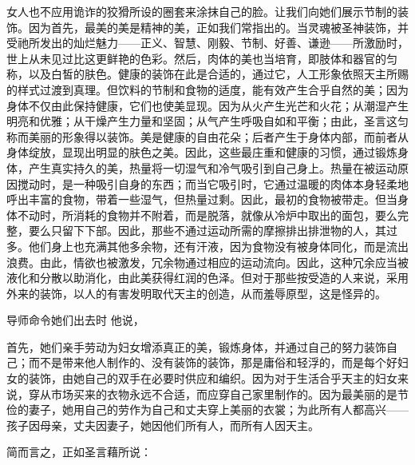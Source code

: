 女人也不应用诡诈的狡猾所设的圈套来涂抹自己的脸。让我们向她们展示节制的装饰。因为首先，最美的美是精神的美，正如我们常指出的。当灵魂被圣神装饰，并受祂所发出的灿烂魅力——正义、智慧、刚毅、节制、好善、谦逊——所激励时，世上从未见过比这更鲜艳的色彩。然后，肉体的美也当培育，即肢体和器官的匀称，以及白皙的肤色。健康的装饰在此是合适的，通过它，人工形象依照天主所赐的样式过渡到真理。但饮料的节制和食物的适度，能有效产生合乎自然的美；因为身体不仅由此保持健康，它们也使美显现。因为从火产生光芒和火花；从潮湿产生明亮和优雅；从干燥产生力量和坚固；从气产生呼吸自如和平衡；由此，圣言这匀称而美丽的形象得以装饰。美是健康的自由花朵；后者产生于身体内部，而前者从身体绽放，显现出明显的肤色之美。因此，这些最庄重和健康的习惯，通过锻炼身体，产生真实持久的美，热量将一切湿气和冷气吸引到自己身上。热量在被运动原因搅动时，是一种吸引自身的东西；而当它吸引时，它通过温暖的肉体本身轻柔地呼出丰富的食物，带着一些湿气，但热量过剩。因此，最初的食物被带走。但当身体不动时，所消耗的食物并不附着，而是脱落，就像从冷炉中取出的面包，要么完整，要么只留下下部。因此，那些不通过运动所需的摩擦排出排泄物的人，其过多。他们身上也充满其他多余物，还有汗液，因为食物没有被身体同化，而是流出浪费。由此，情欲也被激发，冗余物通过相应的运动流向。因此，这种冗余应当被液化和分散以助消化，由此美获得红润的色泽。但对于那些按受造的人来说，采用外来的装饰，以人的有害发明取代天主的创造，从而羞辱原型，这是怪异的。\par

导师命令她们出去时 他说，\par

首先，她们亲手劳动为妇女增添真正的美，锻炼身体，并通过自己的努力装饰自己；而不是带来他人制作的、没有装饰的装饰，那是庸俗和轻浮的，而是每个好妇女的装饰，由她自己的双手在必要时供应和编织。因为对于生活合乎天主的妇女来说，穿从市场买来的衣物永远不合适，而应穿自己家里制作的。因为最美丽的是节俭的妻子，她用自己的劳作为自己和丈夫穿上美丽的衣裳；为此所有人都高兴——孩子因母亲，丈夫因妻子，她因他们所有人，而所有人因天主。\par

简而言之，正如圣言藉所说：\par

